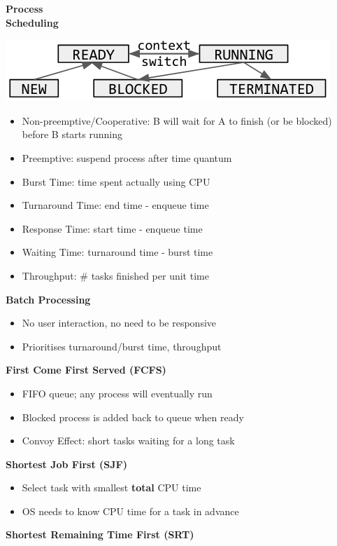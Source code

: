 \documentclass[a4paper, 12pt]{article}
\begin{document}
\begin{multicols*}{4}
\begin{minipage}{.33\linewidth}
	{\small\textbf{Process \\ Scheduling}}
\end{minipage}
\begin{minipage}{.66\linewidth}
	\includegraphics[scale=0.3]{5-state.png}
\end{minipage}
\begin{itemize}
	\item Non-preemptive/Cooperative: B will wait for A to finish (or be blocked) before B starts running
	\item Preemptive: suspend process after time quantum
	\item Burst Time: time spent actually using CPU
	\item Turnaround Time: end time - enqueue time
	\item Response Time: start time - enqueue time
	\item Waiting Time: turnaround time - burst time
	\item Throughput: \# tasks finished per unit time
\end{itemize}
\textbf{Batch Processing}
\begin{itemize}
	\item No user interaction, no need to be responsive
	\item Prioritises turnaround/burst time, throughput
\end{itemize}
\textbf{First Come First Served (FCFS)}
\begin{itemize}
	\item FIFO queue; any process will eventually run
	\item Blocked process is added back to queue when ready
	\item Convoy Effect: short tasks waiting for a long task
\end{itemize}
\textbf{Shortest Job First (SJF)}
\begin{itemize}
	\item Select task with smallest \textbf{total} CPU time
	\item OS needs to know CPU time for a task in advance
\end{itemize}
\textbf{Shortest Remaining Time First (SRT)}
\begin{itemize}

\end{itemize}
\end{multicols*}
\end{document}
